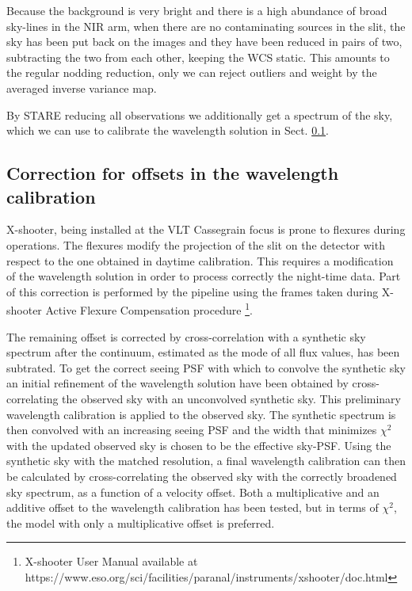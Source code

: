 \documentclass{aa}    %
\begin{document}
Because the background is very bright and there is a high abundance of broad
sky-lines in the NIR arm, when there are no contaminating sources in the slit,
the sky has been put back on the images and they have been reduced in pairs of
two, subtracting the two from each other, keeping the WCS static. This amounts
to the regular nodding reduction, only we can reject outliers and weight by the
averaged inverse variance map.

By STARE reducing all observations we additionally get a spectrum of the sky,
which we can use to calibrate the wavelength solution in Sect. \ref{wavecal}.


\subsection{Correction for offsets in the wavelength calibration}    \label{wavecal}

X-shooter, being installed at the VLT Cassegrain focus is  prone to flexures
during operations. The flexures modify the projection of the slit on the
detector with respect to the one obtained in daytime calibration. This requires a
modification of the wavelength solution in order to process correctly the
night-time data. Part of this correction is performed by the pipeline using the
frames taken during X-shooter Active Flexure Compensation procedure
\footnote{X-shooter User Manual available at
	https://www.eso.org/sci/facilities/paranal/instruments/xshooter/doc.html}.

The remaining offset is corrected by cross-correlation with a synthetic sky
spectrum \citep{Noll2012, Jones2013} after the continuum, estimated as the mode
of all flux values, has been subtrated. To get the correct seeing PSF with which
to convolve the synthetic sky an initial refinement of the wavelength solution
have been obtained by cross-correlating the observed sky with an unconvolved
synthetic sky. This preliminary wavelength calibration is applied to the
observed sky. The synthetic spectrum is then convolved with an increasing seeing
PSF and the width that minimizes $\chi^2$ with the updated observed sky is
chosen to be the effective sky-PSF. Using the synthetic sky with the matched
resolution, a final wavelength calibration can then be calculated by
cross-correlating the observed sky with the correctly broadened sky spectrum, as
a function of a velocity offset. Both a multiplicative and an additive offset to
the wavelength calibration has been tested, but in terms of $\chi^2$, the model
with only a multiplicative offset is preferred.
\end{document}
